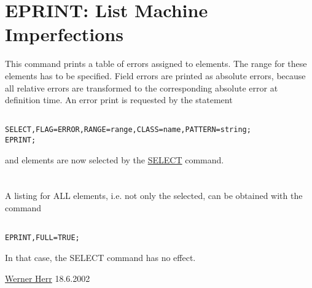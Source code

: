



\section{EPRINT: List Machine Imperfections}  This command prints a table of errors assigned to elements. The range for these elements has to be specified. Field errors are printed as absolute errors, because all relative errors are transformed to the corresponding absolute error at definition time. An error print is requested by the statement 
\begin{verbatim}

SELECT,FLAG=ERROR,RANGE=range,CLASS=name,PATTERN=string;
EPRINT;
\end{verbatim} and elements are now selected by the \href{../Introduction/select.html}{SELECT} command. 
\\
\\
\\ A listing for ALL elements, i.e. not only the selected, can be obtained with the command 
\begin{verbatim}

EPRINT,FULL=TRUE;
\end{verbatim} In that case, the SELECT command has no effect.

 \href{http://consult.cern.ch/xwho/people/1808}{Werner Herr} 18.6.2002 

